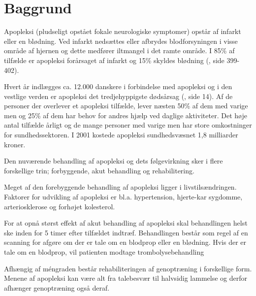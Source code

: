 \chapter{Baggrund} \label{chap:Baggrund}

Apopleksi (pludseligt opstået fokale neurologiske symptomer) opstår af infarkt eller en blødning. Ved infarkt nedsættes eller afbrydes blodforsyningen i visse område af hjernen og dette medfører iltmangel i det ramte område. I 85\% af tilfælde er apopleksi forårsaget af infarkt og 15\% skyldes blødning (\cite{RefWorks:32}, side 399-402).

Hvert år indlægges ca. 12.000 danskere i forbindelse med apopleksi og i den vestlige verden er apopleksi det tredjehyppigste dødsårsag (\cite{RefWorks:21}, side 14). Af de personer der overlever et apopleksi tilfælde, lever næsten 50\% af dem med varige men og 25\% af dem har behov for andres hjælp ved daglige aktiviteter.  Det høje antal tilfælde årligt og de mange personer med varige men har store omkostninger for sundhedssektoren.  I 2001 kostede apopleksi sundhedsvæsnet 1,8 milliarder kroner. 

Den nuværende behandling af apopleksi og dets følgevirkning sker i flere forskellige trin; forbyggende, akut behandling og rehabilitering. 

Meget af den forebyggende behandling af apopleksi ligger i livstilsændringen. Faktorer for udvikling af apopleksi er bl.a. hypertension, hjerte-kar sygdomme, arteriosklerose og forhøjet kolesterol. 

For at opnå størst effekt af akut behandling af apopleksi skal behandlingen helst ske inden for 5 timer efter tilfældet indtræf. Behandlingen består som regel af en scanning for afgøre om der er tale om en blodprop eller en blødning. Hvis der er tale om en blodprop, vil patienten modtage trombolysebehandling 

Afhængig af méngraden består rehabiliteringen af genoptræning i forskellige form. Menene af apopleksi kan være alt fra talebesvær til halvsidig lammelse og derfor afhænger genoptræning også deraf. 

